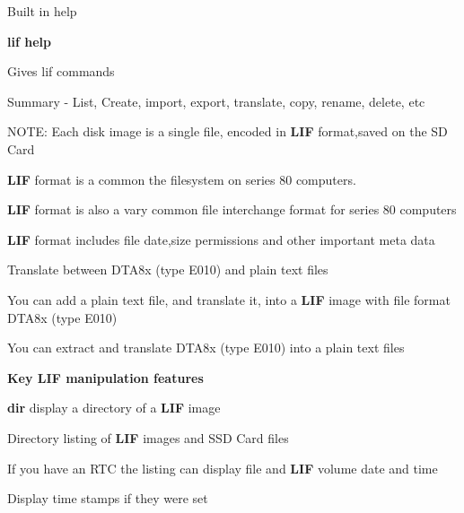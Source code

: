 \begin{DoxyItemize}
\item Built in help
\begin{DoxyItemize}
\item {\bfseries lif help}
\begin{DoxyItemize}
\item Gives lif commands
\end{DoxyItemize}
\end{DoxyItemize}
\item Summary -\/ List, Create, import, export, translate, copy, rename, delete, etc
\item N\+O\+TE\+: Each disk image is a single file, encoded in {\bfseries L\+IF} format,saved on the SD Card
\begin{DoxyItemize}
\item {\bfseries L\+IF} format is a common the filesystem on series 80 computers.
\item {\bfseries L\+IF} format is also a vary common file interchange format for series 80 computers
\begin{DoxyItemize}
\item {\bfseries L\+IF} format includes file date,size permissions and other important meta data
\end{DoxyItemize}
\end{DoxyItemize}
\item Translate between D\+T\+A8x (type E010) and plain text files
\begin{DoxyItemize}
\item You can add a plain text file, and translate it, into a {\bfseries L\+IF} image with file format D\+T\+A8x (type E010)
\item You can extract and translate D\+T\+A8x (type E010) into a plain text files
\end{DoxyItemize}
\item {\bfseries Key L\+IF manipulation features}
\begin{DoxyItemize}
\item {\bfseries dir} display a directory of a {\bfseries L\+IF} image
\begin{DoxyItemize}
\item Directory listing of {\bfseries L\+IF} images and S\+SD Card files
\item If you have an R\+TC the listing can display file and {\bfseries L\+IF} volume date and time
\begin{DoxyItemize}
\item Display time stamps if they were set

\end{DoxyItemize}
\end{DoxyItemize}
\end{DoxyItemize}
\end{DoxyItemize}
